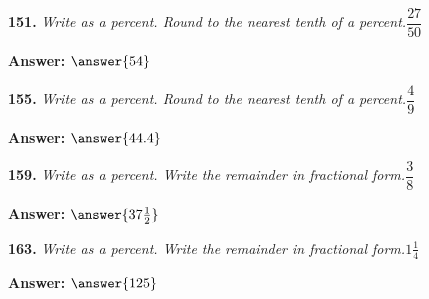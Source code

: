 \documentclass{ximera}
\begin{document}
\begin{problem}
\textbf{151.} \emph{Write as a percent. Round to the nearest tenth of a percent.}\quad $\dfrac{27}{50}$

\textbf{Answer:} $\answer{54}$
\end{problem}

\begin{problem}
\textbf{155.} \emph{Write as a percent. Round to the nearest tenth of a percent.}\quad $\dfrac{4}{9}$

\textbf{Answer:} $\answer{44.4}$
\end{problem}

\begin{problem}
\textbf{159.} \emph{Write as a percent. Write the remainder in fractional form.}\quad $\dfrac{3}{8}$

\textbf{Answer:} $\answer{37\frac{1}{2}}$
\end{problem}

\begin{problem}
\textbf{163.} \emph{Write as a percent. Write the remainder in fractional form.}\quad $1\tfrac{1}{4}$

\textbf{Answer:} $\answer{125}$
\end{problem}
\end{document}
